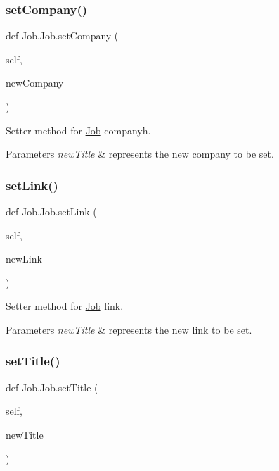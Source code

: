 \subsubsection{\texorpdfstring{set\+Company()}{setCompany()}}
{\footnotesize\ttfamily def Job.\+Job.\+set\+Company (\begin{DoxyParamCaption}\item[{}]{self,  }\item[{}]{new\+Company }\end{DoxyParamCaption})}



Setter method for \hyperlink{classJob_1_1Job}{Job} companyh. 


\begin{DoxyParams}{Parameters}
{\em new\+Title} & represents the new company to be set. \\
\hline
\end{DoxyParams}
\mbox{\label{classJob_1_1Job_a2dc788d81d886501bb544aaadb468022}} 
\subsubsection{\texorpdfstring{set\+Link()}{setLink()}}
{\footnotesize\ttfamily def Job.\+Job.\+set\+Link (\begin{DoxyParamCaption}\item[{}]{self,  }\item[{}]{new\+Link }\end{DoxyParamCaption})}



Setter method for \hyperlink{classJob_1_1Job}{Job} link. 


\begin{DoxyParams}{Parameters}
{\em new\+Title} & represents the new link to be set. \\
\hline
\end{DoxyParams}
\mbox{\label{classJob_1_1Job_ac7a9711243e3183bc887fb6731feb153}} 
\subsubsection{\texorpdfstring{set\+Title()}{setTitle()}}
{\footnotesize\ttfamily def Job.\+Job.\+set\+Title (\begin{DoxyParamCaption}\item[{}]{self,  }\item[{}]{new\+Title }\end{DoxyParamCaption})}



